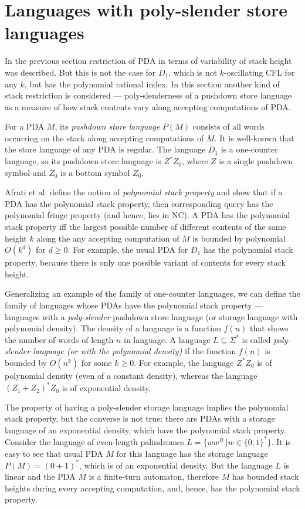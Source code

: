 \section{Languages with poly-slender store languages}
\label{sec:poly}
In the previous section restriction of PDA in terms of variability of stack height was described. But this is not the case for $D_1$, which is not $k$-oscillating CFL for any $k$, but has the polynomial rational index. In this section another kind of stack restriction is considered --- poly-slenderness of a pushdown store language as a measure of how stack contents vary along accepting computations of PDA.


For a PDA $M$, its \textit{pushdown store language} $P(M)$ consists of all words
occurring on the stack along accepting computations of $M$. It is well-known that the store language of any PDA is regular. The language $D_1$ is a one-counter language, so its pushdown store language is $Z^*Z_0$, where $Z$ is a single pushdown symbol and $Z_0$ is a bottom symbol $Z_0$.


Afrati et al. \cite{ChainQ} define the notion of \textit{polynomial stack property} and show that if a PDA has the polynomial stack property, then corresponding query has the polynomial fringe property (and hence, lies in NC). A PDA has the polynomial stack property iff the largest possible number of different contents of the same height $k$ along the any accepting computation of $M$ is bounded by polynomial $O(k^d)$ for $d \ge 0$.  For example, the usual PDA for $D_1$ has the polynomial stack property, because there is only one possible variant of contents for every stack height. 


Generalizing an example of the family of one-counter languages, we can define the family of languages whose PDAs have the polynomial stack property --- languages with a \textit{poly-slender} pushdown store language (or storage language with polynomial density). The density of a language is a function $f(n)$ that shows the number of words of length $n$ in language. A language $L \subseteq \Sigma^*$ is called \textit{poly-slender language (or with the polynomial density)} if the function $f(n)$ is bounded by $O(n^k)$ for some $k \ge 0$. For example, the language $Z^*Z_0$ is of polynomial density (even of a constant density), whereas the language ${(Z_1 + Z_2)}^*Z_0$ is of exponential density.


The property of having a poly-slender storage language implies the polynomial stack property, but the converse is not true: there are PDAs with a storage language of an exponential density, which have the polynomial stack property. Consider the language of even-length palindromes $L = \{ ww^R \ | w \in {\{0, 1\}}^*\}$. It is easy to see that usual PDA $M$ for this language has the storage language $P(M) = {(0 + 1)}^*$, which is of an exponential density. But the language $L$ is linear and  the PDA $M$ is a finite-turn automaton, therefore $M$ has bounded stack heights during every accepting computation, and, hence, has the polynomial stack property. 


